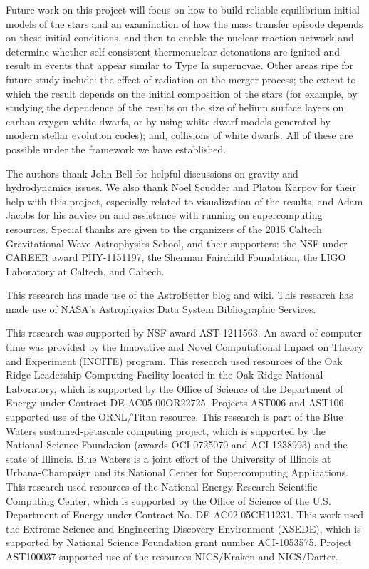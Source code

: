\documentclass[iop]{../emulateapj}
\begin{document}
Future work on this project will focus on how to build 
reliable equilibrium initial models of the stars and 
an examination of how the mass transfer episode depends on 
these initial conditions, and then to enable the nuclear 
reaction network and determine whether self-consistent 
thermonuclear detonations are ignited and result in 
events that appear similar to Type Ia supernovae. Other 
areas ripe for future study include: the effect of radiation 
on the merger process; the extent to which the result 
depends on the initial composition of the stars (for example, 
by studying the dependence of the results on the size of helium 
surface layers on carbon-oxygen white dwarfs, or by using 
white dwarf models generated by modern stellar evolution 
codes); and, collisions of white dwarfs. All of 
these are possible under the framework we have established.

\acknowledgments

The authors thank John Bell for helpful discussions on gravity 
and hydrodynamics issues. We also thank Noel Scudder and Platon Karpov 
for their help with this project, especially related to visualization of the results, 
and Adam Jacobs for his advice on and assistance with 
running on supercomputing resources. Special thanks are given 
to the organizers of the 2015 Caltech Gravitational Wave 
Astrophysics School, and their supporters: the NSF 
under CAREER award PHY-1151197, the Sherman Fairchild 
Foundation, the LIGO Laboratory at Caltech, and Caltech.

This research has made use of the AstroBetter blog and wiki. 
This research has made use of NASA's Astrophysics Data System 
Bibliographic Services.

This research was supported by NSF award AST-1211563. An
award of computer time was provided by the Innovative and Novel
Computational Impact on Theory and Experiment (INCITE) program.  This
research used resources of the Oak Ridge Leadership Computing Facility
located in the Oak Ridge National Laboratory, which is supported by
the Office of Science of the Department of Energy under Contract
DE-AC05-00OR22725. Projects AST006 and AST106 supported use of the ORNL/Titan resource. 
This research is part of the Blue Waters sustained-petascale computing project, 
which is supported by the National Science Foundation (awards OCI-0725070 
and ACI-1238993) and the state of Illinois. Blue Waters is a joint 
effort of the University of Illinois at Urbana-Champaign and its 
National Center for Supercomputing Applications.
This research used resources of the National Energy Research Scientific Computing
Center, which is supported by the Office of Science of the
U.S. Department of Energy under Contract No. DE-AC02-05CH11231.  
This work used the Extreme Science and Engineering Discovery Environment (XSEDE), 
which is supported by National Science Foundation grant number ACI-1053575. 
Project AST100037 supported use of the resources NICS/Kraken and NICS/Darter.
\end{document}
